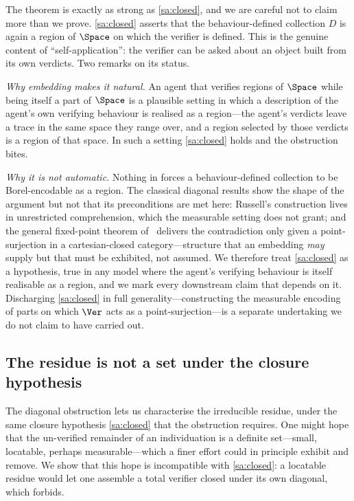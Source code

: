 \begin{remark}
\label{rem:self-app}
The theorem is exactly as strong as \ref{sa:closed}, and we are careful not to
claim more than we prove. \ref{sa:closed} asserts that the behaviour-defined
collection $D$ is again a region of $\Space$ on which the verifier is defined.
This is the genuine content of ``self-application'': the verifier can be asked
about an object built from its own verdicts. Two remarks on its status.

\emph{Why embedding makes it natural.} An agent that verifies regions of $\Space$
while being itself a part of $\Space$ is a plausible setting in which a
description of the agent's own verifying behaviour is realised as a region---the
agent's verdicts leave a trace in the same space they range over, and a region
selected by those verdicts is a region of that space. In such a setting
\ref{sa:closed} holds and the obstruction bites.

\emph{Why it is not automatic.} Nothing in  forces a
behaviour-defined collection to be Borel-encodable as a region. The classical
diagonal results show the shape of the argument but not that its preconditions are
met here: Russell's construction lives in unrestricted comprehension, which the
measurable setting does not grant; and the general fixed-point
theorem of~\citet{lawvere1969} delivers the contradiction only given a
point-surjection in a cartesian-closed category---structure that an embedding
\emph{may} supply but that must be exhibited, not assumed. We therefore treat
\ref{sa:closed} as a hypothesis, true in any model where the agent's verifying
behaviour is itself realisable as a region, and we mark every downstream claim
that depends on it. Discharging \ref{sa:closed} in full generality---constructing
the measurable encoding of parts on which $\Ver$ acts as a point-surjection---is a
separate undertaking we do not claim to have carried out.
\end{remark}

\subsection{The residue is not a set under the closure hypothesis}

The diagonal obstruction lets us characterise the irreducible residue, under the
same closure hypothesis \ref{sa:closed} that the obstruction requires. One might
hope that the un-verified remainder of an individuation is a definite set---small,
locatable, perhaps measurable---which a finer effort could in principle exhibit
and remove. We show that this hope is incompatible with \ref{sa:closed}: a
locatable residue would let one assemble a total verifier closed under its own
diagonal, which  forbids.

